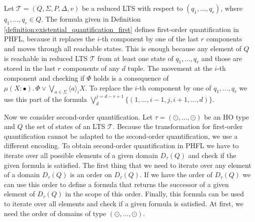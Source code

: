 \begin{observation}
\label{observation:existential_quantification_first}
		Let $\mathcal{T} = (Q, \Sigma, P, \Delta, v)$ be a reduced LTS with respect to $(q_1, \dots, q_r)$, where $q_1, \dots, q_r \in Q$. The formula given in Definition~
		\ref{definition:existential_quantification_first} defines first-order quantification in PHFL, because it replaces the $i$-th component by one of the last $r$ components and moves 
		through all reachable states. This is enough because any element of $Q$ is reachable in reduced LTS $\mathcal{T}$ from at least one state of 
        $q_1, \dots, q_r$ and those are stored in the last $r$ components of any $d$ tuple. The movement at the $i$-th component and checking if $\Phi$ 
        holds is a consequence of $\mu (X \colon \bullet).\,\Phi \vee \bigvee_{a \in \Sigma} \langle a 
        \rangle_{i} X$. To replace the $i$-th component by one of $q_1, \dots, q_r$ 
        we use this part of the formula $\bigvee_{d}^{j=d-r+1} \{(1, \dots, i-1, j, i + 1, \dots, d)\}$.
\end{observation}

Now we consider second-order quantification. Let $\tau = (\odot, \dots, \odot)$ be an HO type and
$Q$ the set of states of an LTS $\mathcal{T}$. Because the transformation for first-order quantification cannot be adapted to the second-order quantification, we use a different encoding. To obtain second-order
quantification in PHFL we have to iterate over all possible elements of a given domain $D_\tau(Q)$ and
check if the given formula is satisfied. The first thing that we need to iterate over any element of a domain
$D_\tau(Q)$ is an order on $D_\tau(Q)$. If we have the order of $D_\tau(Q)$ we can use
this order to define a formula that returns the successor of a given element of $D_\tau(Q)$ in the scope
of this order. Finally, this formula can be used to iterate over all elements and check if a given formula is
satisfied.
At first, we need the order of domains of type $(\odot, \dots, \odot)$.

